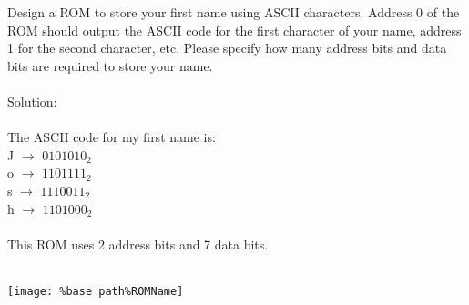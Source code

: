Design a ROM to store your first name using ASCII characters.  Address 0 of the ROM should output the ASCII code for the first character of your name, address 1 for the second character, etc.  Please specify how many address bits and data bits are required to store your name.\\ \\

Solution: \\ \\
The ASCII code for my first name is:\\
J $\rightarrow$ $0101010_2$\\
o $\rightarrow$ $1101111_2$\\
s $\rightarrow$ $1110011_2$\\
h $\rightarrow$ $1101000_2$\\ \\
This ROM uses 2 address bits and 7 data bits.\\ \\
\begin{center}
  \texttt{[image: \%base path\%ROMName]}
\end{center}
